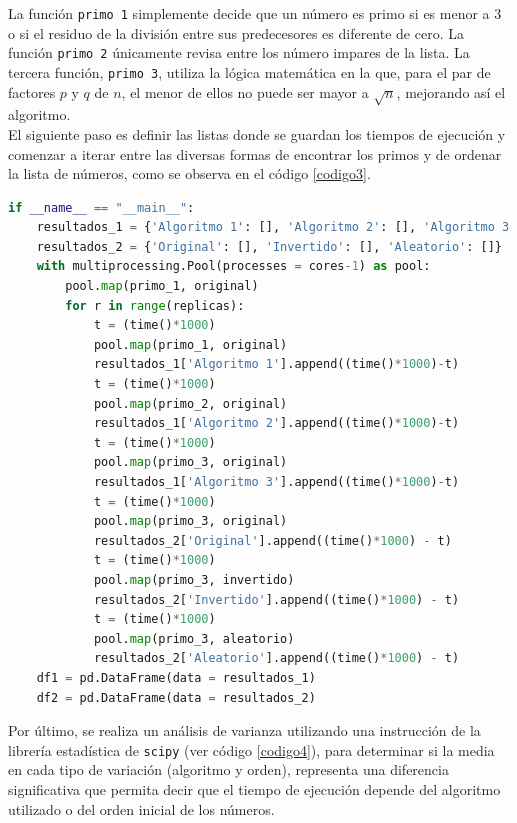 \documentclass{article}
\begin{document}
La funci\'on \texttt{primo 1} simplemente decide que un n\'umero es primo si es menor a 3 o si el residuo de la divisi\'on entre sus predecesores es diferente de cero. La funci\'on \texttt{primo 2} \'unicamente revisa entre los n\'umero impares de la lista. La tercera funci\'on, \texttt{primo 3}, utiliza la l\'ogica matem\'atica en la que, para el par de factores $p$ y $q$ de $n$, el menor de ellos no puede ser mayor a $\sqrt{n}$, mejorando as\'i el algoritmo.\\

El siguiente paso es definir las listas donde se guardan los tiempos de ejecuci\'on y comenzar a iterar entre las diversas formas de encontrar los primos y de ordenar la lista de n\'umeros, como se observa en el c\'odigo \ref{codigo3}.

\begin{lstlisting}[caption=Ejecuci\'on de c\'odigos, label=codigo3, language=Python]
if __name__ == "__main__":
    resultados_1 = {'Algoritmo 1': [], 'Algoritmo 2': [], 'Algoritmo 3': []}              
    resultados_2 = {'Original': [], 'Invertido': [], 'Aleatorio': []}
    with multiprocessing.Pool(processes = cores-1) as pool:
        pool.map(primo_1, original)
        for r in range(replicas):
            t = (time()*1000)
            pool.map(primo_1, original)
            resultados_1['Algoritmo 1'].append((time()*1000)-t)
            t = (time()*1000)
            pool.map(primo_2, original)
            resultados_1['Algoritmo 2'].append((time()*1000)-t)
            t = (time()*1000)
            pool.map(primo_3, original)
            resultados_1['Algoritmo 3'].append((time()*1000)-t)
            t = (time()*1000)
            pool.map(primo_3, original)
            resultados_2['Original'].append((time()*1000) - t)
            t = (time()*1000)
            pool.map(primo_3, invertido)
            resultados_2['Invertido'].append((time()*1000) - t)
            t = (time()*1000)
            pool.map(primo_3, aleatorio)
            resultados_2['Aleatorio'].append((time()*1000) - t)
    df1 = pd.DataFrame(data = resultados_1)
    df2 = pd.DataFrame(data = resultados_2)
\end{lstlisting}

Por \'ultimo, se realiza un an\'alisis de varianza utilizando una instrucci\'on de la librer\'ia estad\'istica de \texttt{scipy} (ver c\'odigo \ref{codigo4}), para determinar si la media en cada tipo de variaci\'on (algoritmo y orden), representa una diferencia significativa que permita decir que el tiempo de ejecuci\'on depende del algoritmo utilizado o del orden inicial de los n\'umeros.
\end{document}
